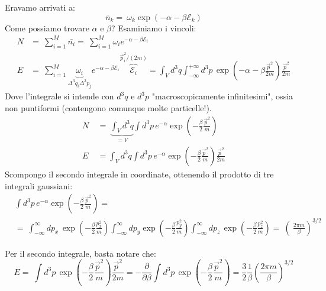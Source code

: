 \documentclass[12pt]{article}
\begin{document}
Eravamo arrivati a:
\[
\bar{n}_k =\ \omega_k \exp(-\alpha -\beta\mathcal{E}_k)
\]
Come possiamo trovare $\alpha$ e $\beta$? Esaminiamo i vincoli:
\begin{align*}
N &=\ \sum_{i=1}^M \bar{n_i} =\ \sum_{i=1}^M \omega_i e^{-\alpha -\beta \mathcal{E}_i}\\
E &=\ \sum_{i=1}^M \underbrace{\omega_i}_{\Delta^3 q_i \Delta^3 p_j} e^{-\alpha -\beta\mathcal{E_i}} \overbrace{\mathcal{E}_i}^{\vec{p}_i^2/(2m)} = \int_V d^3 q \int_{-\infty}^{+\infty} d^3 p\, \exp \left (-\alpha -\beta \frac{\vec{p}^2}{2m} \right ) \frac{\vec{p}^2}{2m}
\end{align*}
Dove l'integrale si intende con $d^3 q $ e $d^3 p$ "macroscopicamente infinitesimi", ossia non puntiformi (contengono comunque molte particelle!).\\
\begin{align*}
N\ &=\ \underbrace{\int_V d^3 q}_{=V} \int d^3 p\, e^{-\alpha} \exp\left(-\frac{\beta}{2}\frac{\vec{p}^2}{m}\right )\\
E\ &= \int_V d^3q \int d^3 p\, e^{-\alpha} \exp\left(-\frac{\beta}{2}\frac{\vec{p}^2}{m}\right) \frac{\vec{p}^2}{2m}
\end{align*}
Scompongo il secondo integrale in coordinate, ottenendo il prodotto di tre integrali gaussiani:
\begin{align*}
&\int d^3 p\, e^{-\alpha} \exp\left(-\frac{\beta}{2}\frac{\vec{p}^2}{m}\right ) =\\
&=\ \int_{-\infty}^{\infty} dp_x \, \exp\left(-\frac{\beta}{2}\frac{p_x^2}{m}\right ) \int_{-\infty}^{\infty} dp_y \exp\left(-\frac{\beta}{2}\frac{p_y^2}{m}\right )
\int_{-\infty}^{\infty} dp_z \, \exp\left(-\frac{\beta}{2}\frac{p_z^2}{m}\right )
 =\ \left (\ \frac{2\pi m}{\beta}\right)^{3/2}
\end{align*}

Per il secondo integrale, basta notare che:
\[
E =\ \int d^3 p\, \exp \left (-\frac{\beta}{2}\frac{\vec{p}^2}{m}\right ) \frac{\vec{p}^2}{2m} = -\frac{\partial}{\partial \beta} \int d^3 p\, \exp\left (-\frac{\beta}{2} \frac{\vec{p}^2}{m}\right ) = \frac{3}{2}\frac{1}{\beta} \left(\frac{2\pi m}{\beta} \right )^{3/2}
\]
\end{document}
